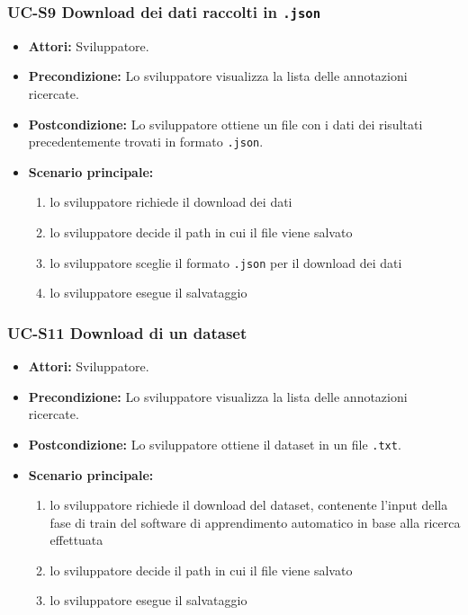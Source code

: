 \subsubsection{UC-S9 Download dei dati raccolti in \texttt{.json}}
		\begin{itemize}
			\item \textbf{Attori:} Sviluppatore.
			\item \textbf{Precondizione:} Lo sviluppatore visualizza la lista delle annotazioni ricercate.
			\item \textbf{Postcondizione:} Lo sviluppatore ottiene un file con i dati dei risultati precedentemente trovati in formato \texttt{.json}.
			\item \textbf{Scenario principale:}
				\begin{enumerate}
					\item lo sviluppatore richiede il download dei dati
					\item lo sviluppatore decide il path in cui il file viene salvato
					\item lo sviluppatore sceglie il formato \texttt{.json} per il download dei dati
					\item lo sviluppatore esegue il salvataggio
				\end{enumerate}
		\end{itemize}
				
	\subsubsection{UC-S11 Download di un dataset}
		\begin{itemize}
			\item \textbf{Attori:} Sviluppatore.
			\item \textbf{Precondizione:} Lo sviluppatore visualizza la lista delle annotazioni ricercate.
			\item \textbf{Postcondizione:} Lo sviluppatore ottiene il dataset in un file \texttt{.txt}.
			\item \textbf{Scenario principale:}
			\begin{enumerate}
				\item lo sviluppatore richiede il download del dataset, contenente l'input della fase di train del software di apprendimento automatico in base alla ricerca effettuata
				\item lo sviluppatore decide il path in cui il file viene salvato
				\item lo sviluppatore esegue il salvataggio
			\end{enumerate}
		\end{itemize}
		
